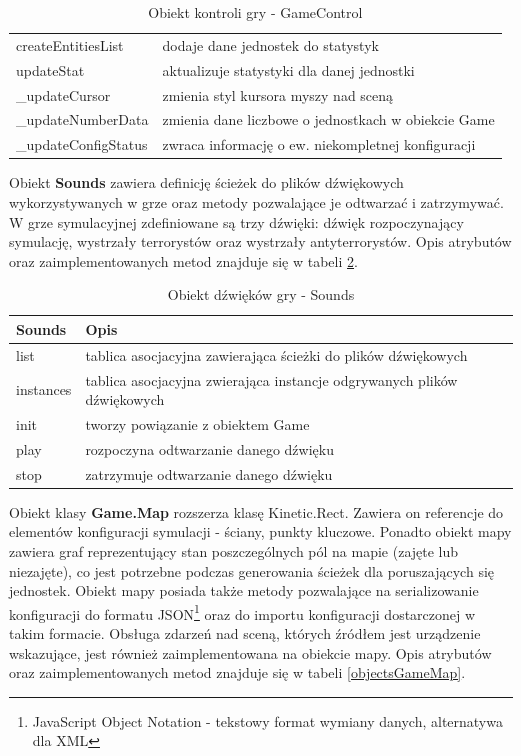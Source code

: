 \begin{table}
\begin{center}
\begin{tabular}{|p{}|p{}|}
	createEntitiesList & dodaje dane jednostek do statystyk\\
	updateStat & aktualizuje statystyki dla danej jednostki\\
	\_updateCursor & zmienia styl kursora myszy nad sceną\\
	\_updateNumberData & zmienia dane liczbowe o jednostkach w obiekcie Game\\
	\_updateConfigStatus & zwraca informację o ew. niekompletnej konfiguracji 
\\\hline
\end{tabular}
\caption {Obiekt kontroli gry - GameControl\label{objectsGameControl}}
\end{center}
\end{table} 

Obiekt \textbf{Sounds} zawiera definicję ścieżek do plików dźwiękowych wykorzystywanych w grze oraz metody pozwalające je odtwarzać i zatrzymywać. W grze symulacyjnej zdefiniowane są trzy dźwięki: dźwięk rozpoczynający symulację, wystrzały terrorystów oraz wystrzały antyterrorystów. Opis atrybutów oraz zaimplementowanych metod znajduje się w tabeli \ref{objectsSounds}. 

\begin{table}
\begin{center}
\begin{tabular}{|p{}|p{}|}
\hline
\textbf{Sounds} & Opis\\\hline		
	list & tablica asocjacyjna zawierająca ścieżki do plików dźwiękowych\\
	instances & tablica asocjacyjna zwierająca instancje odgrywanych plików dźwiękowych
\\\hline
	init & tworzy powiązanie z obiektem Game\\
	play & rozpoczyna odtwarzanie danego dźwięku\\
	stop & zatrzymuje odtwarzanie danego dźwięku
\\\hline
\end{tabular}
\caption {Obiekt dźwięków gry - Sounds\label{objectsSounds}}
\end{center}
\end{table} 

Obiekt klasy \textbf{Game.Map} rozszerza klasę Kinetic.Rect. Zawiera on referencje do elementów konfiguracji symulacji - ściany, punkty kluczowe. Ponadto obiekt mapy zawiera graf reprezentujący stan poszczególnych pól na mapie (zajęte lub niezajęte), co jest potrzebne podczas generowania ścieżek dla poruszających się jednostek. Obiekt mapy posiada także metody pozwalające na serializowanie konfiguracji do formatu JSON\footnote{JavaScript Object Notation - tekstowy format wymiany danych, alternatywa dla XML} oraz do importu konfiguracji dostarczonej w takim formacie. Obsługa zdarzeń nad sceną, których źródłem jest urządzenie wskazujące, jest również zaimplementowana na obiekcie mapy. Opis atrybutów oraz zaimplementowanych metod znajduje się w tabeli \ref{objectsGameMap}.  

